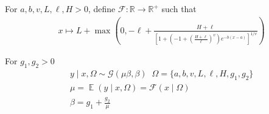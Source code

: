 \documentclass[a4paper,12pt]{article}
\DeclareMathOperator{\E}{\mathbb{E}}
\begin{document}
    For $a, b, v, L, \ell, H > 0$, define $\mathcal{F}: \mathbb{R} \to \mathbb{R}^{+}$ such that
    \begin{align*}
        &x \mapsto L + \max\left(0, -\ell + \frac{H + \ell}{\left[1 + \left(-1 + \left(\frac{H + \ell}{\ell}\right)^{v}\right)e^{-b(x-a)}\right]^{1/v}} \right) \tag{4.2.1}
    \end{align*}


For $g_1, g_2 > 0$
    \begin{align*}
    &y \mid x, \Omega \sim \mathcal{G}\left(\mu\beta, \beta\right) \;\; \Omega = \{ a, b, v, L, \ell, H, g_1, g_2\} \tag{4.2.2} \\
    &\mu = \E\left(y \mid x, \Omega\right) = \mathcal{F}\left(x \mid \Omega\right) \tag{4.2.3}\\
    &\beta = g_1 + \frac{g_2}{\mu} \tag{4.2.4}\\
    \end{align*}
\end{document}
